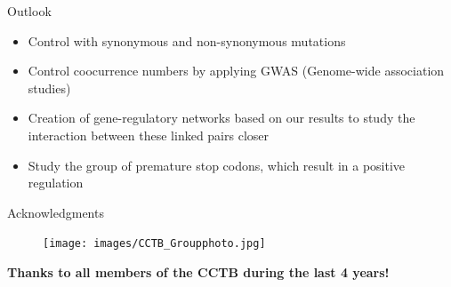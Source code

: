 \documentclass{beamer}
\begin{document}
\begin{frame}{Outlook}
	\begin{itemize}
	\item Control with synonymous and non-synonymous mutations
	\item Control coocurrence numbers by applying GWAS (Genome-wide association studies)
	\item Creation of gene-regulatory networks based on our results to study the interaction between these linked pairs closer 
	\item Study the group of premature stop codons, which result in a positive regulation
	\end{itemize}
\end{frame}
\begin{frame}{Acknowledgments}
	\begin{figure}[tb]
		\centering
		\begin{minipage}[h]{1\textwidth}
		\centering
		\texttt{[image: images/CCTB\_Groupphoto.jpg]}
		\label{fig:CCTB_Groupphoto}
		\end{minipage}
	\end{figure}
	\begin{center}
		\textbf{Thanks to all members of the CCTB during the last 4 years!}
	\end{center}
\end{frame}
\end{document}
